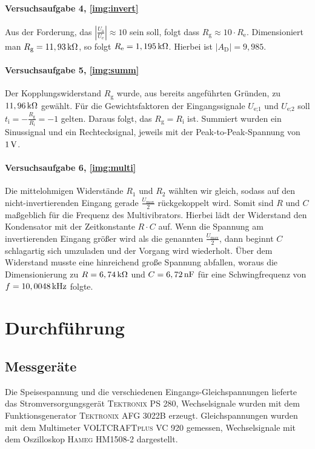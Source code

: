 \documentclass[numbers=noenddot,12pt,a4paper]{scrartcl}
\newcommand{\ix}[1]{_\text{#1}}
\begin{document}
\paragraph{Versuchsaufgabe 4, \ref{img:invert}}
Aus der Forderung, das $\left|\frac{U\ix{a}}{U\ix{e}}\right|\approx10$ sein soll, folgt dass $R\ix{g}\approx10\cdot R\ix{e}$. Dimensioniert man $R\ix{g}=\unit[11,93]{k\Omega}$, so folgt $R\ix{e}=\unit[1,195]{k\Omega}$. Hierbei ist $\left|A\ix{D}\right|=9,985$.
\paragraph{Versuchsaufgabe 5, \ref{img:summ}}
Der Kopplungswiderstand $R\ix{g}$ wurde, aus bereits angeführten Gründen, zu $\unit[11,96]{k\Omega}$ gewählt. Für die Gewichtsfaktoren der Eingangssignale $U\ix{e;1}$ und $U\ix{e;2}$ soll $t\ix{i}=-\frac{R\ix{g}}{R\ix{i}}=-1$ gelten. Daraus folgt, das $R\ix{g}=R\ix{i}$ ist. Summiert wurden ein Sinussignal und ein Rechtecksignal, jeweils mit der Peak-to-Peak-Spannung von $\unit[1]{V}$.
\paragraph{Versuchsaufgabe 6, \ref{img:multi}}
Die mittelohmigen Widerstände $R_1$ und $R_2$ wählten wir gleich, sodass auf den nicht-invertierenden Eingang gerade $\frac{U\ix{max}}{2}$ rückgekoppelt wird. Somit sind $R$ und $C$ maßgeblich für die Frequenz des Multivibrators. Hierbei lädt der Widerstand den Kondensator mit der Zeitkonstante $R\cdot C$ auf. Wenn die Spannung am invertierenden Eingang größer wird als die genannten $\frac{U\ix{max}}{2}$, dann beginnt $C$ schlagartig sich umzuladen und der Vorgang wird wiederholt. Über dem Widerstand musste eine hinreichend große Spannung abfallen, woraus die Dimensionierung zu $R=\unit[6,74]{k\Omega}$ und $C=\unit[6,72]{nF}$ für eine Schwingfrequenz von $f=\unit[10,0048]{kHz}$ folgte.
\section{Durchführung}
\subsection{Messgeräte}
Die Speisespannung und die verschiedenen Eingangs-Gleichspannungen lieferte das Stromversorgungsgerät \textsc{Tektronix PS 280}, Wechselsignale wurden mit dem Funktionsgenerator \textsc{Tektronix AFG 3022B} erzeugt. Gleichspannungen wurden mit dem Multimeter \textsc{VOLTCRAFTplus VC 920} gemessen, Wechselsignale mit dem Oszilloskop \textsc{Hameg HM1508-2} dargestellt.
\end{document}
